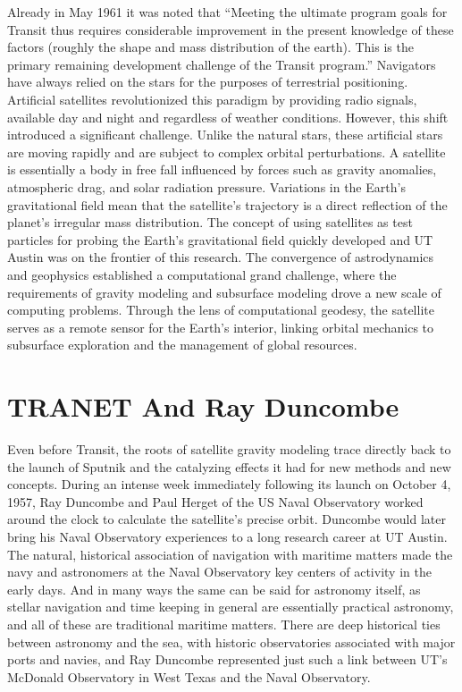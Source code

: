 Already in May 1961 it was noted that “Meeting the ultimate program goals for Transit thus requires considerable improvement in the present knowledge of these factors (roughly the shape and mass distribution of the earth). This is the primary remaining development challenge of the Transit program.” Navigators have always relied on the stars for the purposes of terrestrial positioning. Artificial satellites revolutionized this paradigm by providing radio signals, available day and night and regardless of weather conditions. However, this shift introduced a significant challenge. Unlike the natural stars, these artificial stars are moving rapidly and are subject to complex orbital perturbations. 
A satellite is essentially a body in free fall influenced by forces such as gravity anomalies, atmospheric drag, and solar radiation pressure. Variations in the Earth’s gravitational field mean that the satellite’s trajectory is a direct reflection of the planet's irregular mass distribution. The concept of using satellites as test particles for probing the Earth’s gravitational field quickly developed and UT Austin was on the frontier of this research. The convergence of astrodynamics and geophysics established a computational grand challenge, where the requirements of gravity modeling and subsurface modeling drove a new scale of computing problems. Through the lens of computational geodesy, the satellite serves as a remote sensor for the Earth's interior, linking orbital mechanics to subsurface exploration and the management of global resources. 

\section{TRANET And Ray Duncombe}

Even before Transit, the roots of satellite gravity modeling trace directly back to the launch of Sputnik and the catalyzing effects it had for new methods and new concepts. During an intense week immediately following its launch on October 4, 1957, Ray Duncombe and Paul Herget of the US Naval Observatory worked around the clock to calculate the satellite's precise orbit. Duncombe would later bring his Naval Observatory experiences to a long research career at UT Austin. The natural, historical association of navigation with maritime matters made the navy and astronomers at the Naval Observatory key centers of activity in the early days. And in many ways the same can be said for astronomy itself, as stellar navigation and time keeping in general are essentially practical astronomy, and all of these are traditional maritime matters. There are deep historical ties between astronomy and the sea, with historic observatories associated with major ports and navies, and Ray Duncombe represented just such a link between UT’s McDonald Observatory in West Texas and the Naval Observatory.

